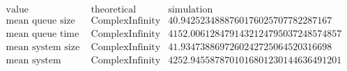 \[\begin{array}{cccc}
 \text{value} & \text{theoretical} & \text{simulation} & \text{} \\
 \text{mean queue size} & \text{ComplexInfinity} & 40.9425234888760176025707782287167 & \text{} \\
 \text{mean queue time} & \text{ComplexInfinity} & 4152.0061284791432124795037248574857 & \text{} \\
 \text{mean system size} & \text{ComplexInfinity} & 41.9347388697260242725064520316698 & \text{} \\
 \text{mean system time} & \text{ComplexInfinity} & 4252.9455878701016801230144636491201 & \text{} \\
\end{array}\]

